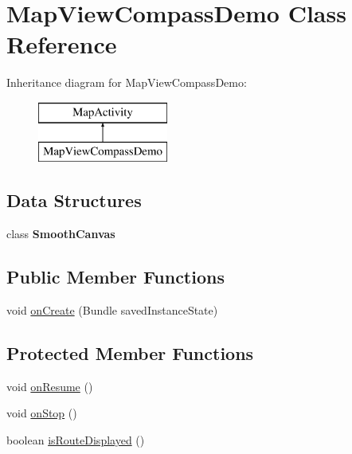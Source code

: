 \hypertarget{classcom_1_1example_1_1android_1_1apis_1_1view_1_1_map_view_compass_demo}{\section{Map\-View\-Compass\-Demo Class Reference}
\label{classcom_1_1example_1_1android_1_1apis_1_1view_1_1_map_view_compass_demo}
}
Inheritance diagram for Map\-View\-Compass\-Demo\-:\begin{figure}[H]
\begin{center}
\leavevmode
\includegraphics[height=2.000000cm]{classcom_1_1example_1_1android_1_1apis_1_1view_1_1_map_view_compass_demo}
\end{center}
\end{figure}
\subsection*{Data Structures}
\begin{DoxyCompactItemize}
\item 
class {\bfseries Smooth\-Canvas}
\end{DoxyCompactItemize}
\subsection*{Public Member Functions}
\begin{DoxyCompactItemize}
\item 
void \hyperlink{classcom_1_1example_1_1android_1_1apis_1_1view_1_1_map_view_compass_demo_a85e87cb5ced88dff7c8173ecc4f636d1}{on\-Create} (Bundle saved\-Instance\-State)
\end{DoxyCompactItemize}
\subsection*{Protected Member Functions}
\begin{DoxyCompactItemize}
\item 
void \hyperlink{classcom_1_1example_1_1android_1_1apis_1_1view_1_1_map_view_compass_demo_a14768c382cfd134f7688413a3eb56d08}{on\-Resume} ()
\item 
void \hyperlink{classcom_1_1example_1_1android_1_1apis_1_1view_1_1_map_view_compass_demo_a458397229d0b2076a739955b1cb8be35}{on\-Stop} ()
\item 
boolean \hyperlink{classcom_1_1example_1_1android_1_1apis_1_1view_1_1_map_view_compass_demo_a294a4986d39cff22365b36850bb2a0ca}{is\-Route\-Displayed} ()
\end{DoxyCompactItemize}


